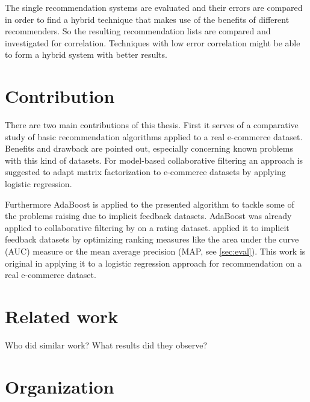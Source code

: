 \documentclass[10pt]{reportMaster}
\begin{document}
The single recommendation systems are evaluated and their errors are compared in order to find a hybrid technique that makes use of the benefits of different recommenders. %
So the resulting recommendation lists are compared and investigated for correlation.
Techniques with low error correlation might be able to form a hybrid system with better results.


\section{Contribution}
There are two main contributions of this thesis.
First it serves of a comparative study of basic recommendation algorithms applied to a real e-commerce dataset.
Benefits and drawback are pointed out, especially concerning known problems with this kind of datasets.
For model-based collaborative filtering an approach is suggested to adapt matrix factorization to e-commerce datasets by applying logistic regression.

Furthermore AdaBoost is applied to the presented algorithm to tackle some of the problems raising due to implicit feedback datasets.
AdaBoost was already applied to collaborative filtering by \cite{boostingCFRatings} on a rating dataset.
\cite{boostingAUC} applied it to implicit feedback datasets by optimizing ranking measures like the area under the curve (AUC) measure or the mean average precision (MAP, see \ref{sec:eval}).
This work is original in applying it to a logistic regression approach for recommendation on a real e-commerce dataset.


\section{Related work}
% 

Who did similar work?
What results did they observe?


\section{Organization}









\end{document}
